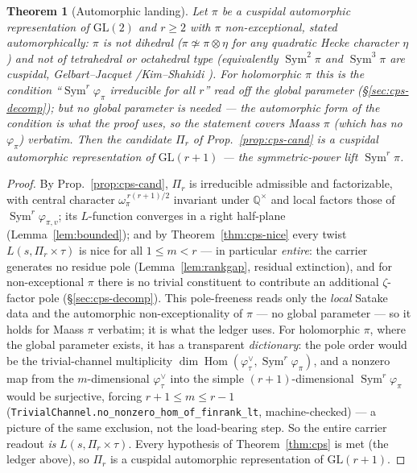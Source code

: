 \documentclass[11pt]{article}
\newtheorem{theorem}{Theorem}
\theoremstyle{definition}
\newcommand{\Sym}{\operatorname{Sym}}
\begin{document}
\begin{theorem}[Automorphic landing]\label{thm:func}
Let $\pi$ be a cuspidal automorphic representation of $\mathrm{GL}(2)$ and $r\ge2$ with $\pi$
\emph{non-exceptional}, stated automorphically: $\pi$ is not dihedral ($\pi\not\simeq\pi\otimes\eta$ for any
quadratic Hecke character $\eta$) and not of tetrahedral or octahedral type (equivalently $\Sym^2\pi$ and
$\Sym^3\pi$ are cuspidal, Gelbart--Jacquet \cite{GJ}/Kim--Shahidi \cite{KimShahidi}). For holomorphic $\pi$ this
is the condition ``$\Sym^r\varphi_\pi$ irreducible for all $r$'' read off the global parameter
(\S\ref{sec:cps-decomp}); but no global parameter is needed --- the automorphic form of the condition is what the
proof uses, so the statement covers Maass $\pi$ (which has no $\varphi_\pi$) verbatim. Then the candidate $\Pi_r$
of Prop.~\ref{prop:cps-cand} is a \emph{cuspidal automorphic} representation of $\mathrm{GL}(r+1)$ --- the
symmetric-power lift $\Sym^r\pi$.
\end{theorem}
\begin{proof}
By Prop.~\ref{prop:cps-cand}, $\Pi_r$ is irreducible admissible and factorizable, with central character
$\omega_\pi^{\,r(r+1)/2}$ invariant under $\mathbb Q^\times$ and local factors those of $\Sym^r\varphi_{\pi,v}$;
its $L$-function converges in a right half-plane (Lemma~\ref{lem:bounded}); and by Theorem~\ref{thm:cps-nice}
every twist $L(s,\Pi_r\times\tau)$ is nice for all $1\le m<r$ --- in particular \emph{entire}: the carrier
generates no residue pole (Lemma~\ref{lem:rankgap}, residual extinction), and for non-exceptional $\pi$ there is
no trivial constituent to contribute an additional $\zeta$-factor pole (\S\ref{sec:cps-decomp}). This
pole-freeness reads only the \emph{local} Satake data and the automorphic non-exceptionality of $\pi$ --- no
global parameter --- so it holds for Maass $\pi$ verbatim; it is what the ledger uses. For holomorphic $\pi$,
where the global parameter exists, it has a transparent \emph{dictionary}: the pole order would be the
trivial-channel multiplicity $\dim\operatorname{Hom}(\varphi_\tau^\vee,\Sym^r\varphi_\pi)$, and a nonzero map from
the $m$-dimensional $\varphi_\tau^\vee$ into the simple $(r+1)$-dimensional $\Sym^r\varphi_\pi$ would be
surjective, forcing $r+1\le m\le r-1$ (\texttt{TrivialChannel.no\_nonzero\_hom\_of\_finrank\_lt}, machine-checked)
--- a picture of the same exclusion, not the load-bearing step. So the entire carrier readout \emph{is}
$L(s,\Pi_r\times\tau)$. Every hypothesis of Theorem~\ref{thm:cps} is met (the ledger above), so $\Pi_r$ is a
cuspidal automorphic representation of $\mathrm{GL}(r+1)$.
\end{proof}
\end{document}

